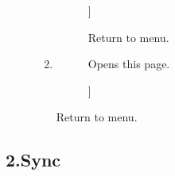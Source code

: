 \documentclass{article}
\begin{document}
\begin{description}
\begin{enumerate}
\begin{description}
											
											]
												 
												Return to menu.
											
										\end{description}
									
									\item 
										\begin{description}
											\item[\textbf{\emph{\paragraph*{Help}}}
												]
												\par Opens this page.
												
												]
													
												
										\end{description}
									
								 
													Return to menu.
								\end{enumerate}
							
								
					\end{description}
				
			
			
			
				
					\subsection*{ 2.Sync}
					
\end{document}
